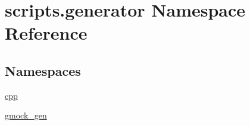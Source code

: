 \hypertarget{namespacescripts_1_1generator}{}\section{scripts.\+generator Namespace Reference}
\label{namespacescripts_1_1generator}
\subsection*{Namespaces}
\begin{DoxyCompactItemize}
\item 
 \mbox{\hyperlink{namespacescripts_1_1generator_1_1cpp}{cpp}}
\item 
 \mbox{\hyperlink{namespacescripts_1_1generator_1_1gmock__gen}{gmock\+\_\+gen}}
\end{DoxyCompactItemize}

